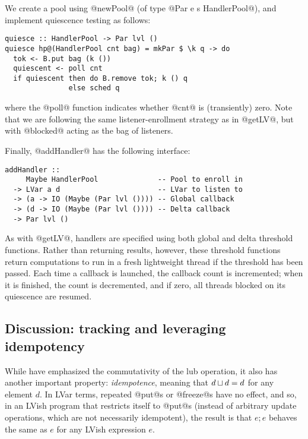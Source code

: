 We create a pool using @newPool@ (of type @Par e s HandlerPool@), and
implement quiescence testing as follows:

\singlespacing
\begin{lstlisting}
quiesce :: HandlerPool -> Par lvl ()
quiesce hp@(HandlerPool cnt bag) = mkPar $ \k q -> do
  tok <- B.put bag (k ())
  quiescent <- poll cnt
  if quiescent then do B.remove tok; k () q
               else sched q
\end{lstlisting}
\doublespacing

where the @poll@ function indicates whether @cnt@ is (transiently)
zero.  Note that we are following the same listener-enrollment
strategy as in @getLV@, but with @blocked@ acting as the bag of
listeners.

Finally, @addHandler@ has the following interface:

\singlespacing
\begin{lstlisting}
addHandler :: 
     Maybe HandlerPool              -- Pool to enroll in
  -> LVar a d                       -- LVar to listen to
  -> (a -> IO (Maybe (Par lvl ()))) -- Global callback
  -> (d -> IO (Maybe (Par lvl ()))) -- Delta callback
  -> Par lvl ()
\end{lstlisting}
\doublespacing

As with @getLV@, handlers are specified using both global and delta
threshold functions.  Rather than returning results, however, these
threshold functions return computations to run in a fresh lightweight
thread if the threshold has been passed.  Each time a callback is
launched, the callback count is incremented; when it is finished, the
count is decremented, and if zero, all threads blocked on its
quiescence are resumed.

\ifdefined\DISSERTATION
\subsection{Discussion: tracking and leveraging idempotency}
\label{subsection:lvish-discussion-leveraging-idempotency}

While  have emphasized the commutativity of the lub operation, it
also has another important property: \emph{idempotence}, meaning that
$d \sqcup d = d$ for any element $d$.  In LVar terms, repeated
@put@s or @freeze@s have no effect, and so, in an LVish program that
restricts itself to @put@s (instead of arbitrary update operations,
which are not necessarily idempotent), the result is that $e; e$
behaves the same as $e$ for any LVish expression $e$.

